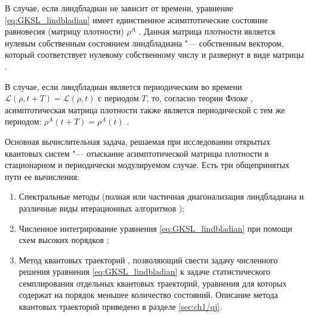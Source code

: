 В случае, если линдбладиан не зависит от времени, уравнение \cref{eq:GKSL_lindbladian} имеет единственное асимптотические состояние равновесия (матрицу плотности) \(\rho^A\) \cite{book2007}.
Данная матрица плотности является нулевым собственным состоянием линдбладиана "--- собственным вектором, который соответствует нулевому собственному числу и развернут в виде матрицы \cite{Albert2014, Albert2016}.

В случае, если линдбладиан является периодическим во времени \(\mathcal{L}(\rho,t + T) = \mathcal{L}(\rho,t)\) с периодом \(T\), то, согласно теории Флоке \cite{Meyer1977}, асимптотическая матрица плотности также является периодической с тем же периодом: \(\rho^A(t + T) = \rho^A(t)\) \cite{Hartmann2017}. 

Основная вычислительная задача, решаемая при исследовании открытых квантовых систем "--- отыскание асимптотической матрицы плотности в стационарном и периодически модулируемом случае. 
Есть три общепринятых пути ее вычисления:
\begin{enumerate}[beginpenalty=10000] %
	\item Спектральные методы (полная или частичная диагонализация линдбладиана и различные виды итерационных алгоритмов \cite{Nation2015, eigenweb, Hernandez2005});
	\item Численное интегрирование уравнения \cref{eq:GKSL_lindbladian} при помощи схем высоких порядков \cite{Lambert1991};
	\item Метод квантовых траекторий \cite{Dum1992, Molmer1993, Plenio1998, Daley2014}, позволяющий свести задачу численного решения уравнения \cref{eq:GKSL_lindbladian} к задаче статистического семплирования отдельных квантовых траекторий, уравнения для которых содержат на порядок меньшее количество состояний.
	Описание метода квантовых траекторий приведено в разделе \cref{sec:ch1/qj}.
\end{enumerate}


